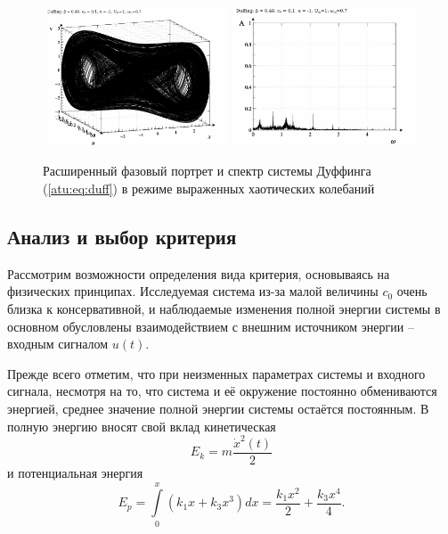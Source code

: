 \begin{figure}[ht!]
\begin{center}
  \includegraphics[width=0.49\textwidth]{p/cha/duff/duff_p_1x00_0x70_0x48.png}
  \hfill
  \includegraphics[width=0.49\textwidth]{p/cha/duff/duff_f_1x00_0x70_0x48.png}
\end{center}
  \caption{Расширенный фазовый портрет и спектр системы Дуффинга (\ref{atu:eq:duff}) в режиме выраженных хаотических колебаний}
\label{atu:f:duff_phase_f_chaos2}
\end{figure}





\subsection{Анализ и выбор критерия}  %

Рассмотрим возможности определения вида критерия,
основываясь на физических принципах.
Исследуемая система из-за
малой величины \(c_0\) очень близка к консервативной,
и наблюдаемые изменения полной энергии системы
в основном обусловлены взаимодействием с внешним
источником энергии -- входным сигналом \(u(t)\).

Прежде всего отметим, что при неизменных параметрах
системы и входного сигнала, несмотря на то, что
система и её окружение постоянно обмениваются энергией,
среднее значение полной энергии системы остаётся постоянным.
В полную энергию вносят свой вклад кинетическая
%
\begin{equation}
E_k = m \frac{\dot{x}^2(t)}{2}
\label{atu:eq:duff_Ek}
\end{equation}
%
и потенциальная энергия
%
\begin{equation}
E_p = \int\limits_0^x ( k_1 x + k_3 x^3 ) dx =
\frac{k_1 x^2}{2} + \frac{k_3 x^4}{4}.
\label{atu:eq:duff_Ep}
\end{equation}

